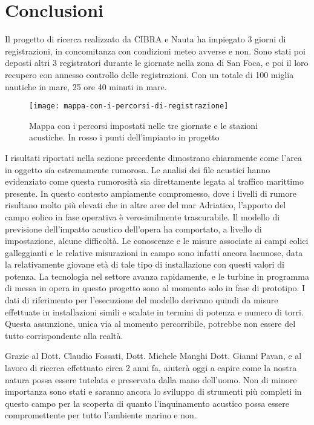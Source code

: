 
\chapter{Conclusioni}
Il progetto di ricerca realizzato da CIBRA e Nauta ha impiegato 3 giorni di registrazioni, in concomitanza con condizioni meteo avverse e non. 
Sono stati poi deposti altri 3 registratori durante le giornate nella zona di San Foca, e poi il loro recupero con annesso controllo delle registrazioni.
Con un totale di 100 miglia nautiche in mare, 25 ore 40 minuti in mare. 

\begin{figure}[h]
\centering
\texttt{[image: mappa-con-i-percorsi-di-registrazione]}
\caption{Mappa con i percorsi impostati nelle tre giornate e le stazioni acustiche. In rosso i punti dell’impianto in progetto}
\end{figure}

I risultati riportati nella sezione precedente dimostrano chiaramente come l’area in oggetto sia estremamente rumorosa.
Le analisi dei file acustici hanno evidenziato come questa rumorosità sia direttamente legata al traffico marittimo presente. 
In questo contesto ampiamente compromesso, dove i livelli di rumore risultano molto più elevati che in altre aree del mar Adriatico, l’apporto del campo eolico in fase operativa è verosimilmente trascurabile. 
Il modello di previsione dell’impatto acustico dell’opera ha comportato, a livello di impostazione, alcune difficoltà. 
Le conoscenze e le misure associate ai campi eolici galleggianti e le relative misurazioni in campo sono infatti ancora lacunose, data la relativamente giovane età di tale tipo di installazione con questi valori di potenza. 
La tecnologia nel settore avanza rapidamente, e le turbine in programma di messa in opera in questo progetto sono al momento solo in fase di prototipo. 
I dati di riferimento per l’esecuzione del modello derivano quindi da misure effettuate in installazioni simili e scalate in termini di potenza e numero di torri. 
Questa assunzione, unica via al momento percorribile, potrebbe non essere del tutto corrispondente alla realtà. 

Grazie al Dott. Claudio Fossati, Dott. Michele Manghi Dott. Gianni Pavan, e al lavoro di ricerca effettuato circa 2 anni fa, aiuterà oggi a capire come la nostra natura possa essere tutelata e preservata dalla mano dell'uomo. 
Non di minore importanza sono stati e saranno ancora lo sviluppo di strumenti più completi in questo campo per la scoperta di quanto l'inquinamento acustico possa essere compromettente per tutto l'ambiente marino e non. 

